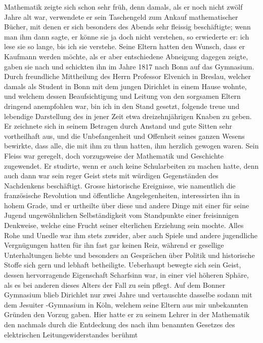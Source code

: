 \documentclass[11pt]{article}
\begin{document}
\noindent Mathematik zeigte sich schon sehr früh, denn damals, als er noch nicht zwölf Jahre alt war, verwendete er sein Taschengeld zum Ankauf mathematischer Bücher, mit denen er sich besonders des Abends sehr fleissig beschäftigte; wenn man ihm dann sagte, er könne sie ja doch nicht verstehen, so erwiederte er: ich lese sie so lange, bis ich sie verstehe. Seine Eltern hatten den Wunsch, dass er Kaufmann werden möchte, als er aber entschiedene Abneigung dagegen zeigte, gaben sie nach und schickten ihn im Jahre 1817 nach Bonn auf das Gymnasium. Durch freundliche Mittheilung des Herrn Professor Elvenich in Breslau, welcher damals als Student in Bonn mit dem jungen Dirichlet in einem Hause wohnte, und welchem dessen Beaufsichtigung und Leitung von den sorgsamen Eltern dringend anempfohlen war, bin ich in den Stand gesetzt, folgende treue und lebendige Darstellung des in jener Zeit etwa dreizehnjährigen Knaben zu geben. Er zeichnete sich in seinem Betragen durch Anstand und gute Sitten sehr vortheilhaft aus, und die Unbefangenheit und Offenheit seines ganzen Wesens bewirkte, dass alle, die mit ihm zu thun hatten, ihm herzlich gewogen waren. Sein Fleiss war geregelt, doch vorzugsweise der Mathematik und Geschichte zugewendet. Er studirte, wenn er auch keine Schularbeiten zu machen hatte, denn auch dann war sein reger Geist stets mit würdigen Gegenständen des Nachdenkens beschäftigt. Grosse historische Ereignisse, wie namentlich die französische Revolution und öffentliche Angelegenheiten, interessirten ihn in hohem Grade, und er urtheilte über diese und andere Dinge mit einer für seine Jugend ungewöhnlichen Selbständigkeit vom Standpunkte einer freisinnigen Denkweise, welche eine Frucht seiner elterlichen Erziehung sein mochte. Alles Rohe und Unedle war ihm stets zuwider, aber auch Spiele und andere jugendliche Vergnügungen hatten für ihn fast gar keinen Reiz, während er gesellige Unterhaltungen liebte und besonders an Gesprächen über Politik und historische Stoffe sich gern und lebhaft betheiligte. Ueberhaupt bewegte sich sein Geist, dessen hervorragende Eigenschaft Scharfsinn war, in einer viel höheren Sphäre, als es bei anderen dieses Alters der Fall zu sein pflegt. Auf dem Bonner Gymnasium blieb Dirichlet nur zwei Jahre und vertauschte dasselbe sodann mit dem Jesuiter -Gymnasium in Köln, welchem seine Eltern aus mir unbekannten Gründen den Vorzug gaben. Hier hatte er zu seinem Lehrer in der Mathematik den nachmals durch die Entdeckung des nach ihm benannten Gesetzes des elektrischen Leitungswiderstandes berühmt
\par
\end{document}
